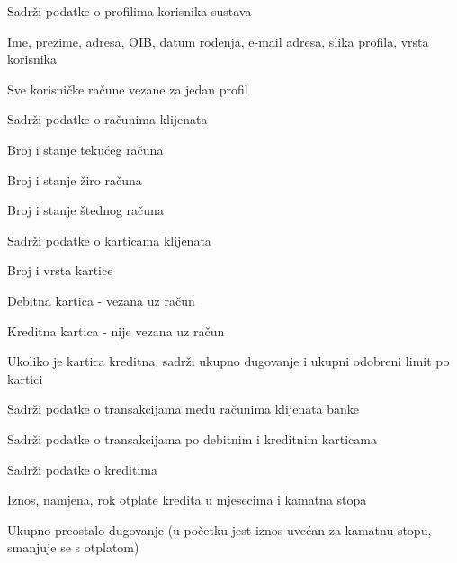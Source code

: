 \begin{packed_enum}
\begin{packed_enum}
					\item Sadrži podatke o profilima korisnika sustava
					\begin{packed_enum}
						\item Ime, prezime, adresa, OIB, datum rođenja, e-mail adresa, slika profila, vrsta korisnika
						\item Sve korisničke račune vezane za jedan profil
					\end{packed_enum}
					\item Sadrži podatke o računima klijenata
					\begin{packed_enum}
						\item Broj i stanje tekućeg računa
						\item Broj i stanje žiro računa
						\item Broj i stanje štednog računa
					\end{packed_enum}
					\item Sadrži podatke o karticama klijenata
					\begin{packed_enum}
						\item Broj i vrsta kartice
						\begin{packed_enum}
							\item Debitna kartica - vezana uz račun
							\item Kreditna kartica - nije vezana uz račun
						\end{packed_enum}
						\item Ukoliko je kartica kreditna, sadrži ukupno dugovanje i ukupni odobreni limit po kartici
					\end{packed_enum}
					\item Sadrži podatke o transakcijama među računima klijenata banke
					\item Sadrži podatke o transakcijama po debitnim i kreditnim karticama
					\item Sadrži podatke o kreditima
					\begin{packed_enum}
						\item Iznos, namjena, rok otplate kredita u mjesecima i kamatna stopa
						\item Ukupno preostalo dugovanje (u početku jest iznos uvećan za kamatnu stopu, smanjuje se s otplatom)
					\end{packed_enum}
					
				\end{packed_enum}
				
				\item	\underbar{Bankar - inicijator}
				

\end{packed_enum}
